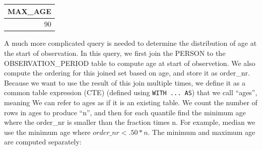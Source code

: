 \documentclass[11pt]{book}
\begin{document}
\begin{longtable}[]{@{}r@{}}
\toprule
MAX\_AGE\tabularnewline
\midrule
\endhead
90\tabularnewline
\bottomrule
\end{longtable}

A much more complicated query is needed to determine the distribution of
age at the start of observation. In this query, we first join the PERSON
to the OBSERVATION\_PERIOD table to compute age at start of observetion.
We also compute the ordering for this joined set based on age, and store
it as order\_nr. Because we want to use the result of this join multiple
times, we define it as a common table expression (CTE) (defined using
\texttt{WITH\ ...\ AS}) that we call ``ages'', meaning We can refer to
ages as if it is an existing table. We count the number of rows in ages
to produce ``n'', and then for each quantile find the minimum age where
the order\_nr is smaller than the fraction times n. For example, median
we use the minimum age where \(order\_nr < .50 * n\). The minimum and
maximum age are computed separately:
\end{document}
